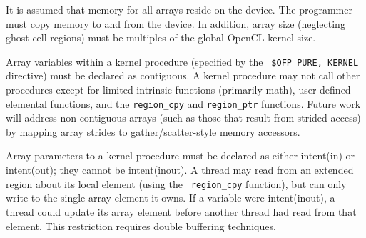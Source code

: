 It is assumed that memory for all arrays reside on the device.  The
programmer must copy memory to and from the device.  In addition,
array size (neglecting ghost cell regions) must be multiples of the
global OpenCL kernel size.

Array variables within a kernel procedure (specified by the {\tt
  \!\$OFP PURE, KERNEL} directive) must be declared as contiguous.  A
kernel procedure may not call other procedures except for limited
intrinsic functions (primarily math), user-defined elemental
functions, and the {\tt region\_cpy} and {\tt region\_ptr} functions.
Future work will address non-contiguous arrays (such as those that
result from strided access) by mapping array strides to
gather/scatter-style memory accessors.

Array parameters to a kernel procedure must be declared as either
intent(in) or intent(out); they cannot be intent(inout).  A thread may
read from an extended region about its local element (using the {\tt
  region\_cpy} function), but can only write to the single array
element it owns.  If a variable were intent(inout), a thread could
update its array element before another thread had read from that
element.  This restriction requires double buffering techniques.
